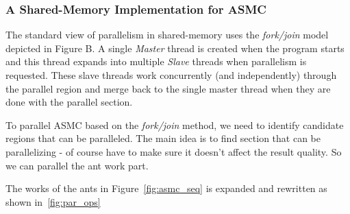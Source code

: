 \documentclass[11pt]{article}
\begin{document}


\subsubsection{A Shared-Memory Implementation for ASMC}

The standard view of parallelism in shared-memory uses the \textit{fork/join} model depicted in Figure B. A single \textit{Master} thread is created when the program starts and this thread expands into multiple \textit{Slave} threads when parallelism is requested. These slave threads work concurrently (and independently) through the parallel region and merge back to the single master thread when they are done with the parallel section.

To parallel ASMC based on the \textit{fork/join} method, we need to identify candidate regions that can be paralleled. 
The main idea is to find section that can be parallelizing - of course have to make sure 
it doesn't affect the result quality.  So we can parallel the ant work part.


The works of the ants in Figure~\ref{fig:asmc_seq} is expanded and rewritten as shown in~\ref{fig:par_ops}

\end{document}

